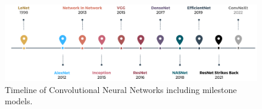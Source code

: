 \begin{figure}[h]
    \centering
    \includegraphics[width=\textwidth]{fig/rel/images/CNN_timeline.pdf}
    \caption{Timeline of Convolutional Neural Networks including milestone models.}
    \label{fig:cnn_timeline}
\end{figure}